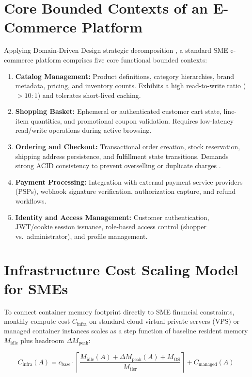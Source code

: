 \section{Core Bounded Contexts of an E-Commerce Platform}
\label{sec:ecommerce-domains}

Applying Domain-Driven Design strategic decomposition \cite{evans2003,richardson2018}, a standard SME e-commerce platform comprises five core functional bounded contexts:
\begin{enumerate}[leftmargin=1.5em]
  \item \textbf{Catalog Management:} Product definitions, category hierarchies, brand metadata, pricing, and inventory counts. Exhibits a high read-to-write ratio ($>10:1$) and tolerates short-lived caching.
  \item \textbf{Shopping Basket:} Ephemeral or authenticated customer cart state, line-item quantities, and promotional coupon validation. Requires low-latency read/write operations during active browsing.
  \item \textbf{Ordering and Checkout:} Transactional order creation, stock reservation, shipping address persistence, and fulfillment state transitions. Demands strong ACID consistency to prevent overselling or duplicate charges \cite{kleppmann2017}.
  \item \textbf{Payment Processing:} Integration with external payment service providers (PSPs), webhook signature verification, authorization capture, and refund workflows.
  \item \textbf{Identity and Access Management:} Customer authentication, JWT/cookie session issuance, role-based access control (shopper vs.\ administrator), and profile management.
\end{enumerate}

\section{Infrastructure Cost Scaling Model for SMEs}
\label{sec:cost-model}

To connect container memory footprint directly to SME financial constraints, monthly compute cost $C_{\text{infra}}$ on standard cloud virtual private servers (VPS) or managed container instances scales as a step function of baseline resident memory $M_{\text{idle}}$ plus headroom $\Delta M_{\text{peak}}$:

\begin{equation}
\label{eq:infra-cost}
C_{\text{infra}}(A) = c_{\text{base}} \cdot \left\lceil \frac{M_{\text{idle}}(A) + \Delta M_{\text{peak}}(A) + M_{\text{OS}}}{M_{\text{tier}}} \right\rceil + C_{\text{managed}}(A)
\end{equation}

